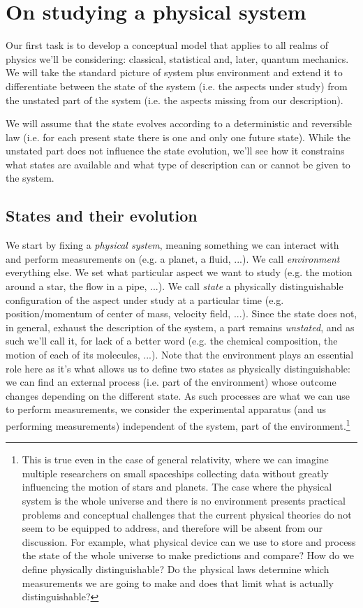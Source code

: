 \documentclass[aps,pra,10pt,twocolumn,floatfix,nofootinbib]{revtex4-1}
\numberwithin{equation}{section}
\theoremstyle{definition}
\begin{document}
\section{On studying a physical system}


Our first task is to develop a conceptual model that applies to all realms of physics we'll be considering: classical, statistical and, later, quantum mechanics. We will take the standard picture of system plus environment and extend it to differentiate between the state of the system (i.e. the aspects under study) from the unstated part of the system (i.e. the aspects missing from our description).

We will assume that the state evolves according to a deterministic and reversible law (i.e. for each present state there is one and only one future state). While the unstated part does not influence the state evolution, we'll see how it constrains what states are available and what type of description can or cannot be given to the system.

\subsection{States and their evolution}

We start by fixing a \emph{physical system}, meaning something we can interact with and perform measurements on (e.g. a planet, a fluid, ...). We call \emph{environment} everything else. We set what particular aspect we want to study (e.g. the motion around a star, the flow in a pipe, ...). We call \emph{state} a physically distinguishable configuration of the aspect under study at a particular time (e.g. position/momentum of center of mass, velocity field, ...). Since the state does not, in general, exhaust the description of the system, a part remains \emph{unstated}, and as such we'll call it, for lack of a better word (e.g. the chemical composition, the motion of each of its molecules, ...). Note that the environment plays an essential role here as it's what allows us to define two states as physically distinguishable: we can find an external process (i.e. part of the environment) whose outcome changes depending on the different state. As such processes are what we can use to perform measurements, we consider the experimental apparatus (and us performing measurements) independent of the system, part of the environment.\footnote{This is true even in the case of general relativity, where we can imagine multiple researchers on small spaceships collecting data without greatly influencing the motion of stars and planets. The case where the physical system is the whole universe and there is no environment presents practical problems  and conceptual challenges that the current physical theories do not seem to be equipped to address, and therefore will be absent from our discussion. For example, what physical device can we use to store and process the state of the whole universe to make predictions and compare? How do we define physically distinguishable? Do the physical laws determine which measurements we are going to make and does that limit what is actually distinguishable?}
 
\end{document}
